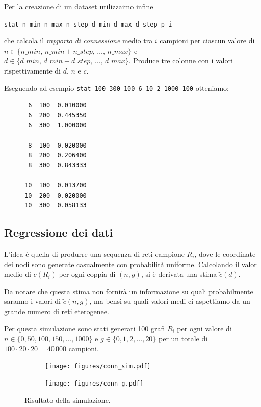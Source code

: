 \documentclass[a4paper,12pt]{article}
\theoremstyle{definition}
\begin{document}
Per la creazione di un dataset utilizzaimo infine

\centerline{\texttt{stat n\_min n\_max n\_step d\_min d\_max d\_step p i}}

che calcola il \emph{rapporto di connessione} medio tra $i$ campioni per ciascun valore di $n \in \{n\_min,\,n\_min+n\_step,\,\dots,\,n\_max\}$ e $d \in \{d\_min,\,d\_min+d\_step,\,\dots,\,d\_max\}$. Produce tre colonne con i valori rispettivamente di $d$, $n$ e $c$.

Eseguendo ad esempio \texttt{stat 100 300 100 6 10 2 1000 100} otteniamo:

\begin{figure}[H]
\centering
\begin{BVerbatim}
 6  100  0.010000
 6  200  0.445350
 6  300  1.000000

 8  100  0.020000
 8  200  0.206400
 8  300  0.843333

10  100  0.013700
10  200  0.020000
10  300  0.058133
\end{BVerbatim}
\end{figure}

\subsection{Regressione dei dati}

L'idea è quella di produrre una sequenza di reti campione $R_i$, dove le coordinate dei nodi sono generate casualmente con probabilità uniforme. Calcolando il valor medio di $c(R_i)$ per ogni coppia di $(n, g)$, si è derivata una stima $\tilde{c}(d)$.

Da notare che questa stima non fornirà un informazione su quali probabilmente saranno i valori di $\tilde{c}(n, g)$, ma bensì su quali valori medi ci aspettiamo da un grande numero di reti eterogenee.

Per questa simulazione sono stati generati 100 grafi $R_i$ per ogni valore di $n \in \{0, 50, 100, 150, \dots, 1000\}$ e $g \in \{0, 1, 2, \dots, 20\}$ per un totale di $100 \cdot 20 \cdot 20 = 40\,000$ campioni.

\begin{figure}[H]
\begin{subfigure}[b]{0.5\textwidth}
\texttt{[image: figures/conn\_sim.pdf]}
\caption{}
\end{subfigure}
\begin{subfigure}[b]{0.5\textwidth}
\texttt{[image: figures/conn\_g.pdf]}
\caption{}
\end{subfigure}
\caption{Risultato della simulazione.}%
\end{figure}
\end{document}
